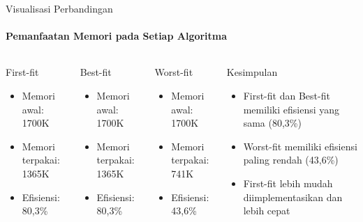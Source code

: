 \documentclass[10pt,aspectratio=169]{beamer}
\begin{document}
\begin{frame}{Visualisasi Perbandingan}
    \framesubtitle{Pemanfaatan Memori pada Setiap Algoritma}
        
        \begin{columns}[T]
                \begin{block}{First-fit}
                    \begin{itemize}
                        \item Memori awal: 1700K
                        \item Memori terpakai: 1365K
                        \item Efisiensi: 80,3\%
                    \end{itemize}
                \end{block}
                
                \begin{block}{Best-fit}
                    \begin{itemize}
                        \item Memori awal: 1700K
                        \item Memori terpakai: 1365K
                        \item Efisiensi: 80,3\%
                    \end{itemize}
                \end{block}
                
                \begin{block}{Worst-fit}
                    \begin{itemize}
                        \item Memori awal: 1700K
                        \item Memori terpakai: 741K
                        \item Efisiensi: 43,6\%
                    \end{itemize}
                \end{block}
                
                \begin{alertblock}{Kesimpulan}
                    \begin{itemize}
                        \item First-fit dan Best-fit memiliki efisiensi yang sama (80,3\%)
                        \item Worst-fit memiliki efisiensi paling rendah (43,6\%)
                        \item First-fit lebih mudah diimplementasikan dan lebih cepat
                    \end{itemize}
                \end{alertblock}
        \end{columns}
\end{frame}
\end{document}
